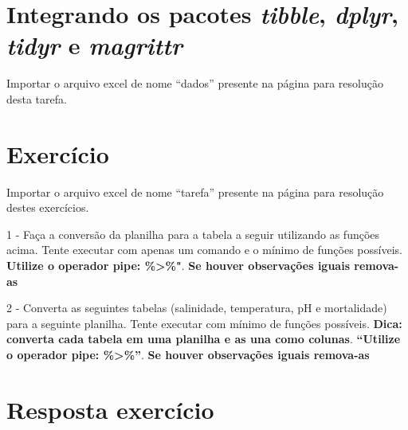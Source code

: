 \documentclass[]{book}
\newenvironment{Shaded}{\begin{snugshade}}{\end{snugshade}}
\newcommand{\CommentTok}[1]{\textcolor[rgb]{0.56,0.35,0.01}{\textit{#1}}}
\begin{document}
\hypertarget{integrando-os-pacotes-tibble-dplyr-tidyr-e-magrittr}{%
\chapter{\texorpdfstring{Integrando os pacotes \emph{tibble}, \emph{dplyr}, \emph{tidyr} e \emph{magrittr}}{Integrando os pacotes tibble, dplyr, tidyr e magrittr}}\label{integrando-os-pacotes-tibble-dplyr-tidyr-e-magrittr}}

Importar o arquivo excel de nome ``dados'' presente na página para resolução desta tarefa.

\begin{Shaded}
\end{Shaded}

\hypertarget{exercuxedcio}{%
\chapter{Exercício}\label{exercuxedcio}}

Importar o arquivo excel de nome ``tarefa'' presente na página para resolução destes exercícios.

1 - Faça a conversão da planilha para a tabela a seguir utilizando as funções acima. Tente executar com apenas um comando e o mínimo de funções possíveis. \textbf{Utilize o operador pipe: \%\textgreater{}\%"}. \textbf{Se houver observações iguais remova-as}

2 - Converta as seguintes tabelas (salinidade, temperatura, pH e mortalidade) para a seguinte planilha. Tente executar com mínimo de funções possíveis. \textbf{Dica: converta cada tabela em uma planilha e as una como colunas}. \textbf{``Utilize o operador pipe: \%\textgreater{}\%''}. \textbf{Se houver observações iguais remova-as}

\hypertarget{resposta-exercuxedcio}{%
\chapter{Resposta exercício}\label{resposta-exercuxedcio}}
\end{document}
